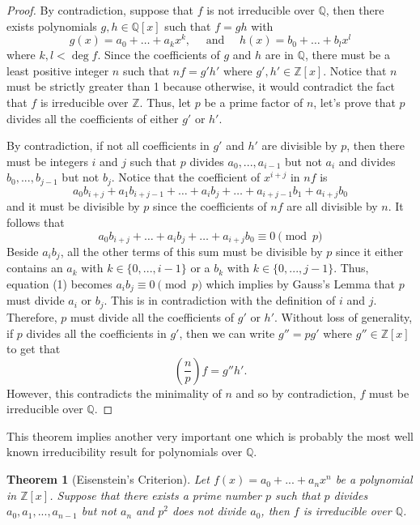 \documentclass{article}
\theoremstyle{plain}
\newtheorem{theorem}{Theorem}[subsection]
\theoremstyle{definition}
\newcommand{\Q}{\mathbb{Q}}
\newcommand{\Z}{\mathbb{Z}}
\begin{document}
\begin{proof}
    By contradiction, suppose that $f$ is not irreducible over $\Q$, then there exists polynomials $g,h \in \Q[x]$ such that $f = gh$ with
    $$g(x) = a_0 + \dots + a_k x^k, \quad \text{ and } \quad h(x) = b_0 + \dots + b_lx^l$$
    where $k,l < \deg f$. Since the coefficients of $g$ and $h$ are in $\Q$, there must be a least positive integer $n$ such that $nf = g'h'$ where $g',h' \in \Z[x]$. Notice that $n$ must be strictly greater than 1 because otherwise, it would contradict the fact that $f$ is irreducible over $\Z$. Thus, let $p$ be a prime factor of $n$, let's prove that $p$ divides all the coefficients of either $g'$ or $h'$.
    
    By contradiction, if not all coefficients in $g'$ and $h'$ are divisible by $p$, then there must be integers $i$ and $j$ such that $p$ divides $a_0, ..., a_{i-1}$ but not $a_i$ and divides $b_0, ..., b_{j-1}$ but not $b_j$. Notice that the coefficient of $x^{i+j}$ in $nf$ is
    $$a_0b_{i+j} + a_1b_{i+j-1} + \dots + a_i b_j + \dots + a_{i+j -1}b_1 + a_{i+j}b_0$$
    and it must be divisible by $p$ since the coefficients of $nf$ are all divisible by $n$. It follows that
    \[a_0b_{i+j} + \dots + a_i b_j + \dots + a_{i+j}b_0 \equiv 0 \pmod p \tag*{(1)} \]
    Beside $a_ib_j$, all the other terms of this sum must be divisible by $p$ since it either contains an $a_k$ with $k \in \{0, ..., i-1\}$ or a $b_k$ with $k\in \{0, ..., j-1\}$. Thus, equation (1) becomes $a_ib_j \equiv 0 \pmod p$ which implies by Gauss's Lemma that $p$ must divide $a_i$ or $b_j$. This is in contradiction with the definition of $i$ and $j$. Therefore, $p$ must divide all the coefficients of $g'$ or $h'$. Without loss of generality, if $p$ divides all the coefficients in $g'$, then we can write $g'' = pg'$ where $g'' \in \Z[x]$ to get that $$\left(\frac{n}{p}\right)f = g'' h'.$$
    However, this contradicts the minimality of $n$ and so by contradiction, $f$ must be irreducible over $\Q$. 
\end{proof}

This theorem implies another very important one which is probably the most well known irreducibility result for polynomials over $\Q$.

\begin{theorem}[Eisenstein's Criterion]
    Let $f(x) = a_0 + ... + a_nx^n$ be a polynomial in $\Z[x]$. Suppose that there exists a prime number $p$ such that $p$ divides $a_0, a_1, ..., a_{n-1}$ but not $a_n$ and $p^2$ does not divide $a_0$, then $f$ is irreducible over $\Q$.
\end{theorem}
\end{document}
